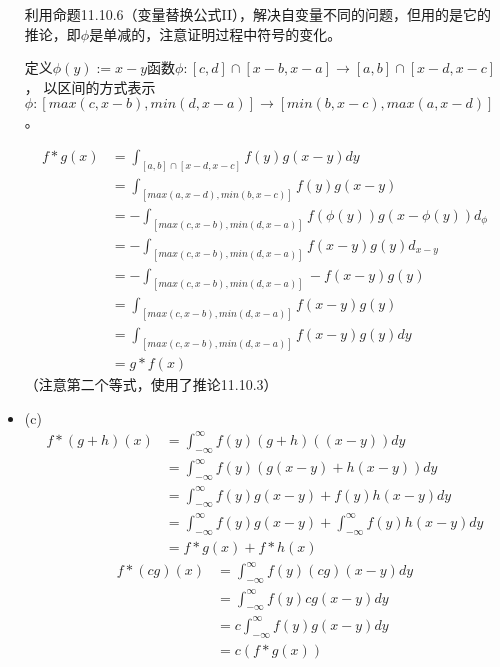 \documentclass{article}
\begin{document}
\begin{itemize}
        利用命题11.10.6（变量替换公式II），解决自变量不同的问题，但用的是它的推论，即$\phi$是单减的，注意证明过程中符号的变化。

        定义$\phi (y) := x - y$函数$\phi : [c, d] \cap [x - b, x - a] \to [a, b] \cap [x - d, x - c]$，
        以区间的方式表示$\phi: [max(c, x - b), min(d, x - a)] \to [min(b, x - c), max(a, x - d)]$。

        \begin{align*}
          f \ast g(x) & = \int_{[a, b] \cap [x - d, x - c]} f(y)g(x - y) dy                       \\
                      & = \int_{[max(a, x - d), min(b, x - c)]} f(y)g(x - y)                      \\
                      & = - \int_{[max(c, x - b), min(d, x - a)]} f(\phi(y))g(x - \phi(y)) d_\phi \\
                      & = - \int_{[max(c, x - b), min(d, x - a)]} f(x - y)g(y) d_{x - y}          \\
                      & = - \int_{[max(c, x - b), min(d, x - a)]} -f(x - y)g(y)                   \\
                      & = \int_{[max(c, x - b), min(d, x - a)]} f(x - y)g(y)                      \\
                      & = \int_{[max(c, x - b), min(d, x - a)]} f(x - y)g(y) dy                   \\
                      & = g \ast f(x)
        \end{align*}
        （注意第二个等式，使用了推论11.10.3）
  \item (c)
        \begin{align*}
          f \ast (g + h)(x) & = \int_{-\infty}^{\infty} f(y)(g + h)((x - y)) dy                               \\
                            & = \int_{-\infty}^{\infty} f(y)(g(x - y) + h(x - y)) dy                          \\
                            & = \int_{-\infty}^{\infty} f(y)g(x - y) + f(y)h(x - y) dy                        \\
                            & = \int_{-\infty}^{\infty} f(y)g(x - y) + \int_{-\infty}^{\infty}f(y)h(x - y) dy \\
                            & = f \ast g(x) + f \ast h(x)
        \end{align*}
        \begin{align*}
          f * (cg)(x) & = \int_{-\infty}^{\infty} f(y)(cg)(x - y)  dy \\
                      & = \int_{-\infty}^{\infty} f(y)cg(x - y)  dy   \\
                      & = c\int_{-\infty}^{\infty} f(y)g(x - y)  dy   \\
                      & = c(f \ast g(x))
        \end{align*}
\end{itemize}
\end{document}
